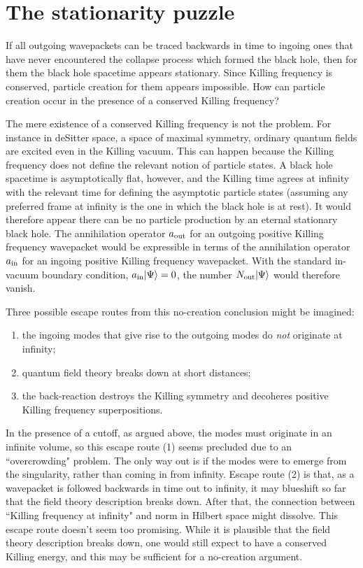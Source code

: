\documentclass[12pt]{article}
\begin{document}
\section{The stationarity puzzle}

If all outgoing wavepackets can be traced backwards in time to ingoing
ones that have never encountered the collapse process which formed the
black hole, then for them the black hole spacetime appears stationary.
Since Killing frequency is conserved, particle creation for them
appears impossible. How can particle creation occur in the presence of
a conserved Killing frequency?

The mere existence of a conserved Killing frequency is not the
problem.  For instance in deSitter space, a space of maximal symmetry,
ordinary quantum fields are excited even in the Killing
vacuum\cite{GibbHawk}. This can happen because the Killing frequency
does not define the relevant notion of particle states. A black hole
spacetime is asymptotically flat, however, and the Killing time agrees
at infinity with the relevant time for defining the asymptotic particle
states (assuming any preferred frame at infinity is the one in which
the black hole is at rest).  It would therefore appear there can be no
particle production by an eternal stationary black hole. The
annihilation operator $a_{\rm out}$ for an outgoing positive Killing
frequency wavepacket would be expressible in terms of the annihilation
operator $a_{\rm in}$ for an ingoing positive Killing frequency
wavepacket. With the standard in-vacuum boundary condition, $a_{\rm
in}|\Psi\rangle=0$, the number $N_{\rm out}|\Psi\rangle$ would
therefore vanish.

Three possible escape routes from this no-creation conclusion might be
imagined:  \begin{enumerate} \item the ingoing modes that give rise to
the outgoing modes do {\it not} originate at infinity; \item quantum
field theory breaks down at short distances; \item the back-reaction
destroys the Killing symmetry and decoheres positive Killing frequency
superpositions.  \end{enumerate} In the presence of a cutoff, as argued
above, the modes must originate in an infinite volume, so this escape
route (1) seems precluded due to an ``overcrowding" problem. The only
way out is if the modes were to emerge from the singularity, rather
than coming in from infinity.  Escape route (2) is that, as a
wavepacket is followed backwards in time out to infinity, it may
blueshift so far that the field theory description breaks down. After
that, the connection between ``Killing frequency at infinity" and norm
in Hilbert space might dissolve.  This escape route doesn't seem too
promising.  While it is plausible that the field theory description
breaks down, one would still expect to have a conserved Killing energy,
and this may be sufficient for a no-creation argument.
\end{document}
